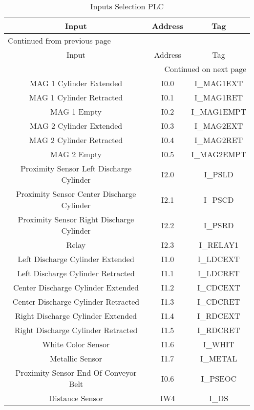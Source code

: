 \begin{longtable}{c|c|c}
\caption{Inputs Selection PLC} \label{tab:plcSelectionInput}
\\
Input & Address & Tag\\
\hline
\endfirsthead
\multicolumn{3}{l}{Continued from previous page} \\
\hline

Input & Address & Tag \\

\hline
\endhead
\hline\multicolumn{3}{r}{Continued on next page} \\
\endfoot
\endlastfoot
\hline
MAG 1 Cylinder Extended & I0.0 & I\_MAG1EXT\\
MAG 1 Cylinder Retracted & I0.1 & I\_MAG1RET \\
MAG 1 Empty & I0.2 & I\_MAG1EMPT\\
MAG 2 Cylinder Extended & I0.3 & I\_MAG2EXT \\
MAG 2 Cylinder Retracted & I0.4 & I\_MAG2RET \\
MAG 2 Empty & I0.5 & I\_MAG2EMPT\\
Proximity Sensor Left Discharge Cylinder & I2.0 & I\_PSLD\\
Proximity Sensor Center Discharge Cylinder & I2.1 & I\_PSCD\\
Proximity Sensor Right Discharge Cylinder & I2.2 & I\_PSRD\\
Relay & I2.3 & I\_RELAY1\\
Left Discharge Cylinder Extended & I1.0 & I\_LDCEXT\\
Left Discharge Cylinder Retracted & I1.1 & I\_LDCRET\\
Center Discharge Cylinder Extended & I1.2 & I\_CDCEXT\\
Center Discharge Cylinder Retracted & I1.3 & I\_CDCRET\\
Right Discharge Cylinder Extended & I1.4 & I\_RDCEXT\\
Right Discharge Cylinder Retracted & I1.5 & I\_RDCRET\\
White Color Sensor & I1.6 & I\_WHIT\\
Metallic Sensor & I1.7 & I\_METAL\\
Proximity Sensor End Of Conveyor Belt & I0.6 & I\_PSEOC\\
Distance Sensor & IW4 & I\_DS\\
\end{longtable}


